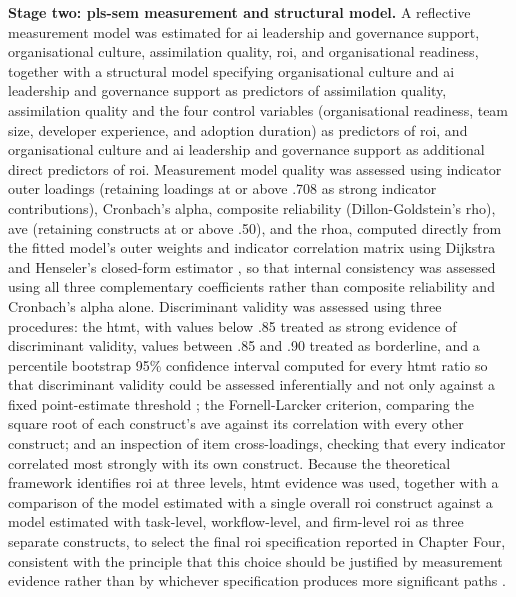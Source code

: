\textbf{Stage two: \gls{pls-sem} measurement and structural model.} A reflective measurement model was estimated for \gls{ai} leadership and governance support, organisational culture, assimilation quality, \gls{roi}, and organisational readiness, together with a structural model specifying organisational culture and \gls{ai} leadership and governance support as predictors of assimilation quality, assimilation quality and the four control variables (organisational readiness, team size, developer experience, and adoption duration) as predictors of \gls{roi}, and organisational culture and \gls{ai} leadership and governance support as additional direct predictors of \gls{roi}. Measurement model quality was assessed using indicator outer loadings (retaining loadings at or above .708 as strong indicator contributions), Cronbach's alpha, composite reliability (Dillon-Goldstein's rho), \gls{ave} (retaining constructs at or above .50), and the \gls{rhoa}, computed directly from the fitted model's outer weights and indicator correlation matrix using Dijkstra and Henseler's closed-form estimator \autocite{Dijkstra2015}, so that internal consistency was assessed using all three complementary coefficients rather than composite reliability and Cronbach's alpha alone. Discriminant validity was assessed using three procedures: the \gls{htmt}, with values below .85 treated as strong evidence of discriminant validity, values between .85 and .90 treated as borderline, and a percentile bootstrap 95\% confidence interval computed for every \gls{htmt} ratio so that discriminant validity could be assessed inferentially and not only against a fixed point-estimate threshold \autocite{Hair2019}; the Fornell-Larcker criterion, comparing the square root of each construct's \gls{ave} against its correlation with every other construct; and an inspection of item cross-loadings, checking that every indicator correlated most strongly with its own construct. Because the theoretical framework identifies \gls{roi} at three levels, \gls{htmt} evidence was used, together with a comparison of the model estimated with a single overall \gls{roi} construct against a model estimated with task-level, workflow-level, and firm-level \gls{roi} as three separate constructs, to select the final \gls{roi} specification reported in Chapter Four, consistent with the principle that this choice should be justified by measurement evidence rather than by whichever specification produces more significant paths \autocite{Hair2019}.

